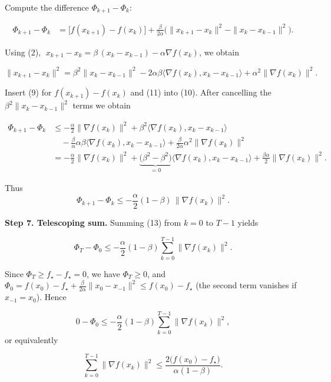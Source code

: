 \documentclass{article}
\begin{document}
Compute the difference $\Phi_{k+1}-\Phi_{k}$:

\[
\begin{aligned}
\Phi_{k+1}-\Phi_{k}
&= \bigl[f(x_{k+1})-f(x_{k})\bigr]
   +\frac{\beta}{2\alpha}\bigl(\|x_{k+1}-x_{k}\|^{2}
                               -\|x_{k}-x_{k-1}\|^{2}\bigr).
\end{aligned}
\tag{10}
\]

Using (2), $\;x_{k+1}-x_{k}= \beta\,(x_{k}-x_{k-1})-\alpha\nabla f(x_{k})$, we obtain

\[
\|x_{k+1}-x_{k}\|^{2}
= \beta^{2}\|x_{k}-x_{k-1}\|^{2}
   -2\alpha\beta\langle\nabla f(x_{k}),x_{k}-x_{k-1}\rangle
   +\alpha^{2}\|\nabla f(x_{k})\|^{2}.
\tag{11}
\]

Insert (9) for $f(x_{k+1})-f(x_{k})$ and (11) into (10). After cancelling the $\beta^{2}\|x_{k}-x_{k-1}\|^{2}$ terms we obtain

\[
\begin{aligned}
\Phi_{k+1}-\Phi_{k}
&\le
   -\frac{\alpha}{2}\|\nabla f(x_{k})\|^{2}
   +\beta^{2}\langle\nabla f(x_{k}),x_{k}-x_{k-1}\rangle\\
&\quad -\frac{\beta}{\alpha}\alpha\beta\langle\nabla f(x_{k}),x_{k}-x_{k-1}\rangle
   +\frac{\beta}{2\alpha}\alpha^{2}\|\nabla f(x_{k})\|^{2}\\
&= -\frac{\alpha}{2}\|\nabla f(x_{k})\|^{2}
   +\underbrace{\bigl(\beta^{2}-\beta^{2}\bigr)}_{=0}
     \langle\nabla f(x_{k}),x_{k}-x_{k-1}\rangle
   +\frac{\beta\alpha}{2}\|\nabla f(x_{k})\|^{2}.
\end{aligned}
\tag{12}
\]

Thus
\[
\Phi_{k+1}-\Phi_{k}
\le -\frac{\alpha}{2}(1-\beta)\,\|\nabla f(x_{k})\|^{2}.
\tag{13}
\]

\noindent\textbf{Step 7.  Telescoping sum.}  
Summing (13) from $k=0$ to $T-1$ yields

\[
\Phi_{T}-\Phi_{0}
\le -\frac{\alpha}{2}(1-\beta)\sum_{k=0}^{T-1}\|\nabla f(x_{k})\|^{2}.
\tag{14}
\]

Since $\Phi_{T}\ge f_{\star}-f_{\star}=0$, we have $\Phi_{T}\ge0$, and $\Phi_{0}=f(x_{0})-f_{\star}+\frac{\beta}{2\alpha}\|x_{0}-x_{-1}\|^{2}\le f(x_{0})-f_{\star}$ (the second term vanishes if $x_{-1}=x_{0}$).  Hence

\[
0-\Phi_{0}\le -\frac{\alpha}{2}(1-\beta)\sum_{k=0}^{T-1}\|\nabla f(x_{k})\|^{2},
\]
or equivalently

\[
\sum_{k=0}^{T-1}\|\nabla f(x_{k})\|^{2}
\le \frac{2\bigl(f(x_{0})-f_{\star}\bigr)}{\alpha(1-\beta)}.
\tag{15}
\]
\end{document}
